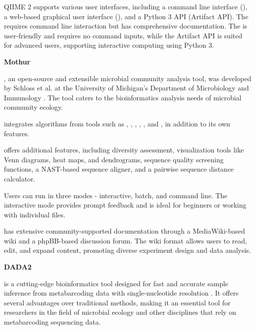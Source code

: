                 QIIME 2 supports various user interfaces, including a command line interface (), a web-based graphical user interface (), and a Python 3 API (Artifact API). The  requires command line interaction but has comprehensive documentation. The  is user-friendly and requires no command inputs, while the Artifact API is suited for advanced users, supporting interactive computing using Python 3.

                    
            \textbf{Mothur}
            
                , an open-source and extensible microbial community analysis tool, was developed by Schloss et al. at the University of Michigan's Department of Microbiology and Immunology \cite{schloss_introducting_2009}. The tool caters to the bioinformatics analysis needs of microbial community ecology.
                
                 integrates algorithms from tools such as , , , ,  , and , in addition to its own features.
                
                 offers additional features, including diversity assessment, visualization tools like Venn diagrams, heat maps, and dendrograms, sequence quality screening functions, a NAST-based sequence aligner, and a pairwise sequence distance calculator.
                
                Users can run  in three modes - interactive, batch, and command line. The interactive mode provides prompt feedback and is ideal for beginners or working with individual files.
                
                 has extensive community-supported documentation through a MediaWiki-based wiki and a phpBB-based discussion forum. The wiki format allows users to read, edit, and expand content, promoting diverse experiment design and data analysis.

            \textbf{DADA2}
            
                 is a cutting-edge bioinformatics tool designed for fast and accurate sample inference from metabarcoding data with single-nucleotide resolution \cite{callahan2016dada2}. It offers several advantages over traditional methods, making it an essential tool for researchers in the field of microbial ecology and other disciplines that rely on metabarcoding sequencing data.

